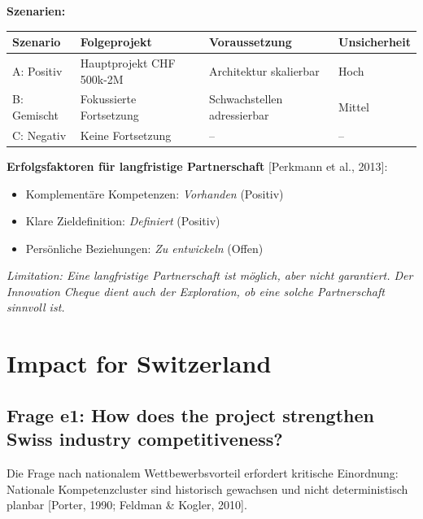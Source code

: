 \documentclass[11pt,a4paper]{article}
\newcommand{\limitation}[1]{\textcolor{limitation}{\textit{Limitation: #1}}}
\newcommand{\evidence}[1]{\textcolor{fehrgray}{[#1]}}
\begin{document}
\textbf{Szenarien:}

\begin{table}[h]
\centering
\begin{tabular}{@{}L{2.5cm}L{5cm}L{4cm}C{2cm}@{}}
\toprule
\textbf{Szenario} & \textbf{Folgeprojekt} & \textbf{Voraussetzung} & \textbf{Unsicherheit} \\
\midrule
A: Positiv & Hauptprojekt CHF 500k-2M & Architektur skalierbar & Hoch \\
B: Gemischt & Fokussierte Fortsetzung & Schwachstellen adressierbar & Mittel \\
C: Negativ & Keine Fortsetzung & -- & -- \\
\bottomrule
\end{tabular}
\end{table}

\textbf{Erfolgsfaktoren für langfristige Partnerschaft} \evidence{Perkmann et al., 2013}:

\begin{itemize}[leftmargin=2em]
    \item Komplementäre Kompetenzen: \textit{Vorhanden} (Positiv)
    \item Klare Zieldefinition: \textit{Definiert} (Positiv)
    \item Persönliche Beziehungen: \textit{Zu entwickeln} (Offen)
\end{itemize}

\limitation{Eine langfristige Partnerschaft ist möglich, aber nicht garantiert. Der Innovation Cheque dient auch der Exploration, ob eine solche Partnerschaft sinnvoll ist.}

\newpage
\section{Impact for Switzerland}

\subsection{Frage e1: How does the project strengthen Swiss industry competitiveness?}

Die Frage nach nationalem Wettbewerbsvorteil erfordert kritische Einordnung: Nationale Kompetenzcluster sind historisch gewachsen und nicht deterministisch planbar \evidence{Porter, 1990; Feldman \& Kogler, 2010}.
\end{document}
